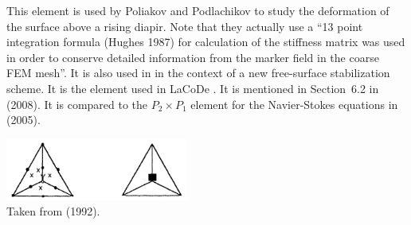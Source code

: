 This element is used by Poliakov and Podlachikov \cite{popo92} to study the deformation of 
the surface above a rising diapir. Note that they actually use a 
``13 point integration formula (Hughes 1987) for calculation of the stiffness matrix was 
used in order to conserve detailed information from the marker field in the coarse FEM mesh''. 
It is also used in \cite{anmp15} in the context of a new free-surface stabilization scheme. 
It is the element used in LaCoDe \cite{demh19}.
It is mentioned in Section~6.2 in \textcite{bobf08} (2008).
It is compared to the $P_2\times P_1$ element for the Navier-Stokes equations in 
\textcite{krba05} (2005).

\begin{center}
\includegraphics[width=6cm]{images/pair_cr/cr}\\
{\captionfont Taken from \textcite{begt92} (1992).}
\end{center}

